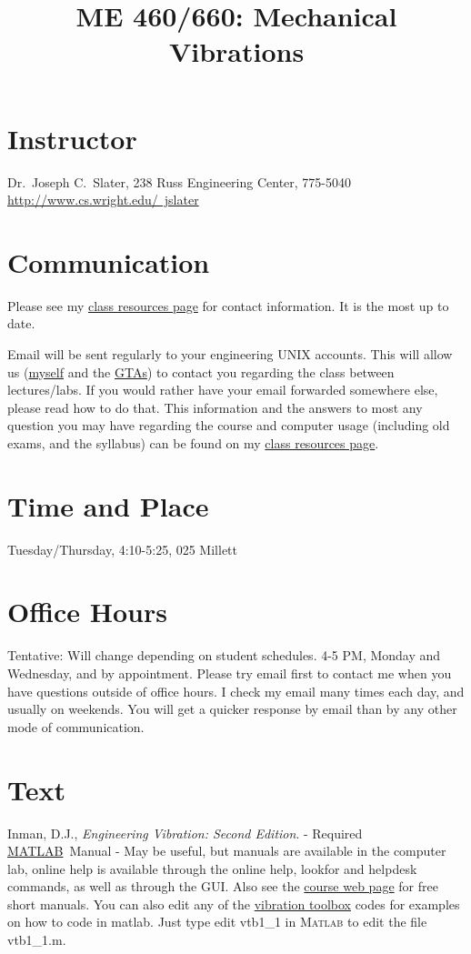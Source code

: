 \documentclass[10pt]{article}
\title{ME 460/660: Mechanical Vibrations}
\date{}
\author{}
\newcommand{\comp}[1]{{{\small\textsf{#1}}}}
\newcommand{\matlab}{\href{http://www.mathworks.com}{M{\small ATLAB}}}
\begin{document}
\maketitle

\section{Instructor}
Dr.~Joseph C.~Slater, 238 Russ Engineering Center, 775-5040\\
\href{http://www.cs.wright.edu/~jslater}{http://www.cs.wright.edu/~jslater}

\section{Communication}
Please see my \href{http://www.cs.wright.edu/~jslater/syllabi.html}{class resources page} for contact information. It is the most up to date. 

 Email will be sent regularly to your engineering UNIX accounts.  This will allow us (\href{http://www.cs.wright.edu/~jslater}{myself} and the \href{mailto:me460ta@cs.wright.edu}{GTAs}) to contact you regarding the class between lectures/labs.  If you would rather have your email forwarded somewhere else, please read how to do that.  This information and the answers to most any question you may have regarding the course and computer usage (including old exams, and the syllabus) can be found on my \href{http://www.cs.wright.edu/~jslater/syllabi.html}{class resources page}.


\section{Time and Place}
Tuesday/Thursday, 4:10-5:25, 025 Millett

\section{Office Hours}
Tentative: Will change depending on student schedules. 4-5 PM, Monday and Wednesday, and by appointment. Please try email first to contact me when you have questions outside of office hours.  I check my email many times each day, and usually on weekends. You will get a quicker response by email than by any other mode of communication.

\section{Text}
Inman, D.J., \textit{Engineering Vibration: Second Edition}.  - Required\\
\matlab\  Manual - May be useful, but manuals are available in 
the computer lab, online help is available through the online \comp{help}, 
\comp{lookfor} and \comp{helpdesk} commands, as well as through the GUI. Also see the \href{http://www.cs.wright.edu/\~jslater/vibration.html}{course web page} for free short manuals. You can also edit any of the \href{http://www.cs.wright.edu/vtoolbox}{vibration toolbox} codes for examples on how to code in matlab. Just type \comp{edit vtb1\_1} in \textsc{Matlab} to edit the file \comp{vtb1\_1.m}. 
\end{document}
